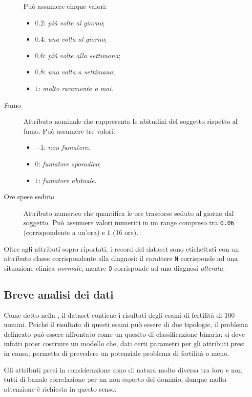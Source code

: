 \begin{description}
    Può assumere cinque valori:
    \begin{itemize}
      \item \(0.2\): \emph{più volte al giorno};
      \item \(0.4\): \emph{una volta al giorno};
      \item \(0.6\): \emph{più volte alla settimana};
      \item \(0.8\): \emph{una volta a settimana};
      \item \(1\): \emph{molto raramente o mai}.
    \end{itemize}
  \item[Fumo]
    Attributo nominale che rappresenta le abitudini del soggetto rispetto al fumo.
    Può assumere tre valori:
    \begin{itemize}
      \item \(-1\): \emph{non fumatore};
      \item \(0\): \emph{fumatore sporadico};
      \item \(1\): \emph{fumatore abituale}.
    \end{itemize}
  \item[Ore spese seduto]
    Attributo numerico che quantifica le ore trascorse seduto al giorno dal soggetto.
    Può assumere valori numerici in un range compreso tra \texttt{0.06} (corrispondente a un'ora) e \(1\) (16 ore).
  \end{description}

Oltre agli attributi sopra riportati, i record del dataset sono etichettati con un attributo classe corrispondente alla diagnosi:
il carattere \texttt{N} corrisponde ad una situazione clinica \emph{normale}, mentre \texttt{O} corrisponde ad una diagnosi \emph{alterata}.

\subsection{Breve analisi dei dati}\label{subsec:intro:analysis}

Come detto nella , il dataset contiene i risultati degli esami di fertilità di 100 uomini.
Poiché il risultato di questi esami può essere di due tipologie, il problema delineato può essere affrontato come un quesito di classificazione binaria:
si deve infatti poter costruire un modello che, dati certi parametri per gli attributi presi in causa, permetta di prevedere un potenziale problema di fertilità o meno.

Gli attributi presi in considerazione sono di natura molto diversa tra loro e non tutti di banale correlazione per un non esperto del dominio, dunque molta attenzione è richiesta in questo senso.
